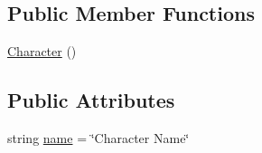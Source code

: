 \subsection*{Public Member Functions}
\begin{DoxyCompactItemize}
\item 
\mbox{\hyperlink{class_character_aeb15ed2a88e93ac33887094427a52476}{Character}} ()
\end{DoxyCompactItemize}
\subsection*{Public Attributes}
\begin{DoxyCompactItemize}
\item 
string \mbox{\hyperlink{class_character_adbfa3b858f99f337203a1bec67b2fe45}{name}} = \char`\"{}Character Name\char`\"{}
\end{DoxyCompactItemize}
